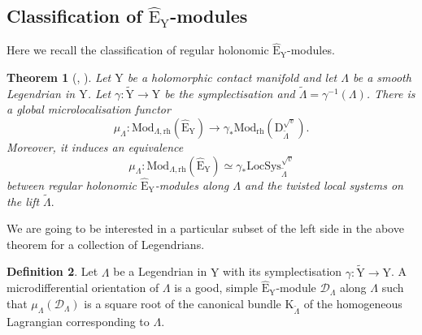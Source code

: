 \documentclass{article}
\theoremstyle{plain}
\newtheorem{theorem}{Theorem}[subsection]   %
\theoremstyle{definition}
\newtheorem{definition}[theorem]{Definition}
\theoremstyle{remark}
\newcommand{\mr}{\mathrm}
\newcommand{\3}{\vspace{3mm}}
\newcommand{\2}{\vspace{2mm}}
\newcommand{\1}{\vspace{1mm}}
\begin{document}
\subsection{Classification of \texorpdfstring{$\widehat{\mr{E}}_\mr{Y}$-}-modules}

Here we recall the classification of regular holonomic $\widehat{\mr{E}}_\mr{Y}$-modules.
\2
\begin{theorem}[\cite{MR2331247}, \cite{saf}]\label{miclass}
Let $\mr{Y}$ be a holomorphic contact manifold and let $\Lambda$ be a smooth Legendrian in $\mr{Y}$. Let $\gamma : \tilde{\mr{Y}}\to \mr{Y}$ be the symplectisation and $\tilde{\Lambda}=\gamma^{-1}(\Lambda)$. There is a global microlocalisation functor $$\mu_{\Lambda}:\mr{Mod}_{\Lambda,\mr{rh}}\left(\widehat{\mr{E}}_\mr{Y}\right)\to \gamma_*\mr{Mod}_\mr{rh}\left(\mr{D}_{\widetilde{\Lambda}}^{\sqrt{v}}\right).$$ Moreover, it induces an equivalence $$\mu_{\Lambda}:\mr{Mod}_{\Lambda,\mr{rh}}\left(\widehat{\mr{E}}_\mr{Y}\right)\simeq \gamma_*\mr{LocSys}_{\tilde{\Lambda}}^{\sqrt{v}}$$ between regular holonomic $\widehat{\mr{E}}_\mr{Y}$-modules along $\Lambda$ and the twisted local systems on the lift $\tilde{\Lambda}.$
\end{theorem} 
\2
We are going to be interested in a particular subset of the left side in the above theorem for a collection of Legendrians. 
\2
\begin{definition}\label{microor}
Let $\Lambda$ be a Legendrian in $\mr{Y}$ with its symplectisation $\gamma:\tilde{\mr{Y}}\to \mr{Y}$. A microdifferential orientation of $\Lambda$ is a good, simple $\widehat{\mr{E}}_\mr{Y}$-module $\mathscr{D}_\Lambda$ along $\Lambda$ such that $\mu_\Lambda\left(\mathscr{D}_\Lambda\right)$ is a square root of the canonical bundle $\mr{K}_{\tilde{\Lambda}}$ of the homogeneous Lagrangian corresponding to $\Lambda$.
\end{definition}
\end{document}
